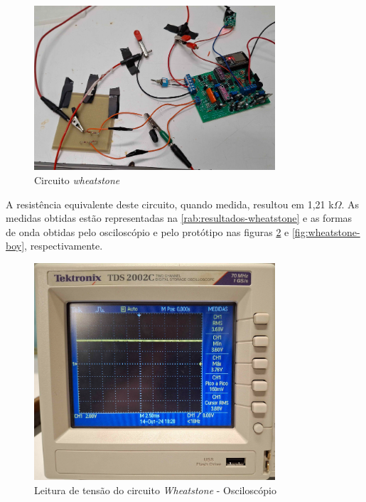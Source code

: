 \begin{figure}[htb!]
    \caption{Circuito \textit{wheatstone}}
    \label{fig:circuito-wheatstone-full}
    \includegraphics[width=0.8\textwidth]{figuras/circuito-wheatstone-full.png}
    \fonte{}
\end{figure}

A resistência equivalente deste circuito, quando medida, resultou em 1,21 k$\Omega$. As medidas obtidas estão representadas na \autoref{rab:resultados-wheatstone} e as formas de onda obtidas pelo osciloscópio e pelo protótipo nas figuras \ref{fig:wheatstone-osc} e \ref{fig:wheatstone-boy}, respectivamente.

\begin{figure}[htb!]
    \caption{Leitura de tensão do circuito \textit{Wheatstone} - Osciloscópio}
    \label{fig:wheatstone-osc}
    \includegraphics[width=0.8\textwidth]{figuras/wheatstone-osc.png}
    \fonte{}
\end{figure}


